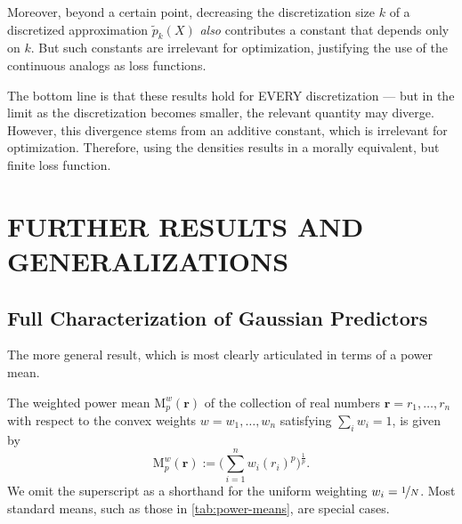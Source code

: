 \documentclass[twoside]{article}
\theoremstyle{plain}
\theoremstyle{definition}
\begin{document}
Moreover, beyond a certain point, decreasing the discretization size $k$ of a discretized approximation $\tilde p_k(X)$ \emph{also} contributes a constant that depends only on $k$.
But such constants are irrelevant for optimization, justifying the use of the continuous analogs as loss functions.


The bottom line is that these results hold for EVERY discretization --- but in the limit as the discretization becomes smaller, the relevant quantity may diverge.
However, this divergence stems from an additive constant, which is irrelevant for optimization. Therefore, using the densities results in a morally equivalent, but finite loss function.

\section{FURTHER RESULTS AND GENERALIZATIONS}
\subsection{Full Characterization of Gaussian Predictors}
The more general result, which is most clearly articulated in terms of a power mean.

\begin{defn}
	The weighted power mean $\mathrm M^w_p(\mathbf r)$ of the collection of real numbers $\mathbf r = r_1, \ldots, r_n$ with respect to the convex weights $w = w_1, \ldots, w_n$ satisfying $\sum_iw_i = 1$, is given by
	\[ \mathrm M^w_p(\mathbf r) := \Big(\sum_{i=1}^n w_i (r_i)^p \Big)^{\frac1p}.\]
	We omit the superscript as a shorthand for the uniform weighting $w_i = \nicefrac{1}{N}$.
	Most standard means, such as those in \cref{tab:power-means}, are special cases.
\end{defn}
\end{document}
